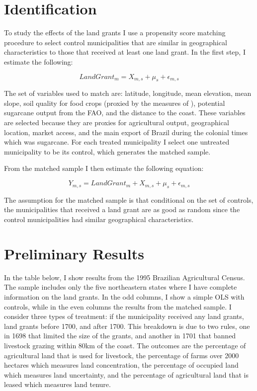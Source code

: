 \documentclass[11pt]{article}
\begin{document}
\section{Identification}

To study the effects of the land grants I use a propensity score matching procedure to select control municipalities that are similar in geographical characteristics to those that received at least one land grant. In the first step, I estimate the following:

\begin{equation}
  LandGrant_m = X_{m,s} + \mu_s + \epsilon_{m,s}
\end{equation}

The set of variables used to match are: latitude, longitude, mean elevation, mean slope, soil quality for food crops (proxied by the measures of \textcite{Galor2016-ba}), potential sugarcane output from the FAO, and the distance to the coast. These variables are selected because they are proxies for agricultural output, geographical location, market access, and the main export of Brazil during the colonial times which was sugarcane. For each treated municipality I select one untreated municipality to be its control, which generates the matched sample.

From the matched sample I then estimate the following equation:

\begin{equation}
  Y_{m,s} = LandGrant_m + X_{m,s} + \mu_s + \epsilon_{m,s}
\end{equation}

The assumption for the matched sample is that conditional on the set of controls, the municipalities that received a land grant are as good as random since the control municipalities had similar geographical characteristics. 

\section{Preliminary Results}

In the table below, I show results from the 1995 Brazilian Agricultural Census. The sample includes only the five northeastern states where I have complete information on the land grants. In the odd columns, I show a simple OLS with controls, while in the even columns the results from the matched sample. I consider three types of treatment: if the municipality received any land grants, land grants before 1700, and after 1700. This breakdown is due to two rules, one in 1698 that limited the size of the grants, and another in 1701 that banned livestock grazing within 80km of the coast. The outcomes are the percentage of agricultural land that is used for livestock, the percentage of farms over 2000 hectares which measures land concentration, the percentage of occupied land which measures land uncertainty, and the percentage of agricultural land that is leased which measures land tenure. 
\end{document}
